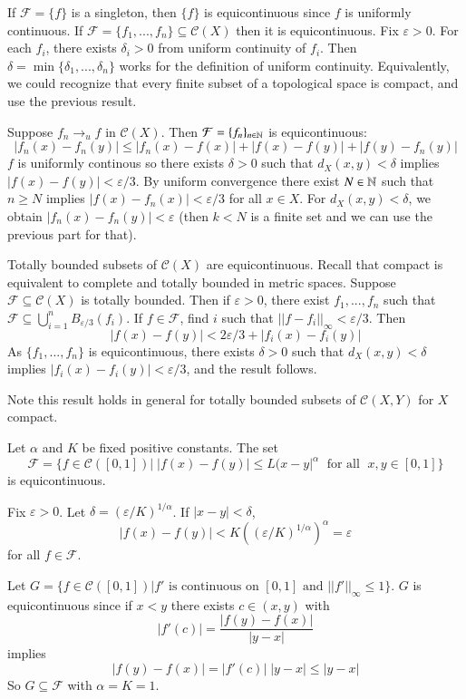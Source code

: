\begin{eg}
    If $\mathcal{F} = \{f\}$ is a singleton, then $\{f\}$ is equicontinuous since $f$ is uniformly continuous. If $\mathcal{F} = \{f_1,...,f_n\} \subseteq \mathcal{C}(X)$ then it is equicontinuous. Fix $\varepsilon > 0$. For each $f_i$, there exists $\delta_i > 0$ from uniform continuity of $f_i$. Then $\delta = \min\{\delta_1,...,\delta_n\}$ works for the definition of uniform continuity. Equivalently, we could recognize that every finite subset of a topological space is compact, and use the previous result.

    Suppose $f_n\rightarrow_uf$ in $\mathcal{C}(X)$. Then $\mathcal{F} = \{f_n\}_{n \in \mathbb N}$ is equicontinuous: $$|f_n(x) - f_n(y)| \leq |f_n(x) - f(x)| + |f(x)-f(y)| + |f(y) - f_n(y)|$$ $f$ is uniformly continous so there exists $\delta > 0$ such that $d_X(x,y) < \delta$ implies $|f(x)-f(y)| < \varepsilon/3$. By uniform convergence there exist $N \in \mathbb N$ such that $n \geq N$ implies $|f(x) - f_n(x)| < \varepsilon/3$ for all $x \in X$. For $d_X(x,y) < \delta$, we obtain $|f_n(x) - f_n(y)| < \varepsilon$ (then $k < N$ is a finite set and we can use the previous part for that).
\end{eg}

\begin{eg}
    Totally bounded subsets of $\mathcal{C}(X)$ are equicontinuous. Recall that compact is equivalent to complete and totally bounded in metric spaces. Suppose $\mathcal{F} \subseteq \mathcal{C}(X)$ is totally bounded. Then if $\varepsilon > 0$, there exist $f_1,...,f_n$ such that $\mathcal{F} \subseteq \bigcup_{i=1}^nB_{\varepsilon/3}(f_i)$. If $f \in \mathcal{F}$, find $i$ such that $||f-f_i||_{\infty} < \varepsilon/3$. Then $$|f(x)-f(y)| < 2\varepsilon/3 + |f_i(x) - f_i(y)|$$ As $\{f_1,...,f_n\}$ is equicontinuous, there exists $\delta > 0$ such that $d_X(x,y) < \delta$ implies $|f_i(x) - f_i(y)| <\varepsilon/3$, and the result follows.
\end{eg}

Note this result holds in general for totally bounded subsets of $\mathcal{C}(X,Y)$ for $X$ compact.

\begin{eg}
    Let $\alpha$ and $K$ be fixed positive constants. The set $$\mathcal{F} = \{f \in \mathcal{C}([0,1])\vert\;|f(x)-f(y)| \leq L(x-y|^{\alpha}\;\text{ for all }\;x,y \in [0,1]\}$$ is equicontinuous. 

    Fix $\varepsilon > 0$. Let $\delta = (\varepsilon/K)^{1/\alpha}$. If $|x-y| < \delta$, $$|f(x) - f(y)| < K((\varepsilon/K)^{1/\alpha})^{\alpha} = \varepsilon$$ for all $f \in \mathcal{F}$.

    Let $G = \{f \in \mathcal{C}([0,1])\vert f'\text{ is continuous on }[0,1] \text{ and } ||f'||_{\infty}\leq 1\}$. $G$ is equicontinuous since if $x < y$ there exists $c \in (x,y)$ with $$|f'(c)| = \frac{|f(y) - f(x)|}{|y-x|}$$ implies $$|f(y)-f(x)| = |f'(c)|\;|y-x| \leq |y-x|$$ So $G \subseteq \mathcal{F}$ with $\alpha = K = 1$.
\end{eg}

